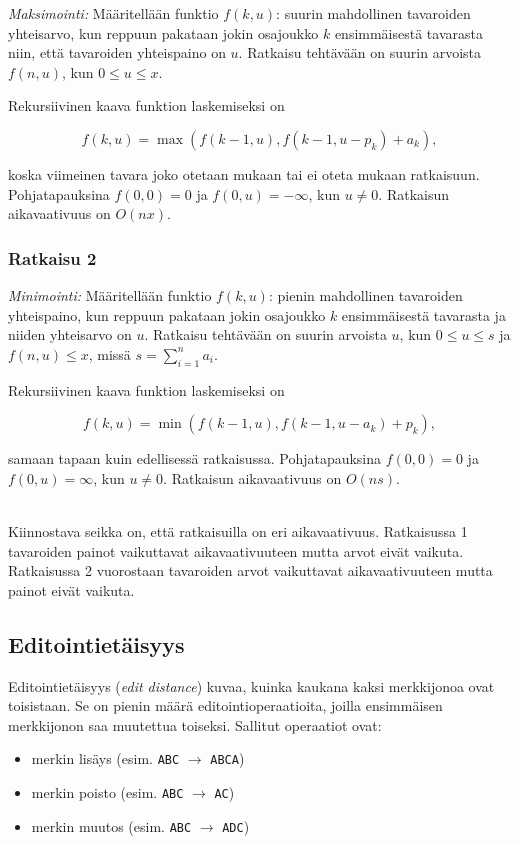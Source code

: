 \textit{Maksimointi:} Määritellään funktio $f(k,u)$:
suurin mahdollinen tavaroiden
yhteisarvo, kun reppuun pakataan jokin osajoukko
$k$ ensimmäisestä tavarasta
niin, että tavaroiden yhteispaino on $u$.
Ratkaisu tehtävään on suurin arvoista
$f(n,u)$, kun $0 \le u \le x$.

Rekursiivinen kaava funktion laskemiseksi on

\[f(k,u) = \max(f(k-1,u),f(k-1,u-p_k)+a_k),\]

koska viimeinen tavara joko otetaan mukaan tai ei
oteta mukaan ratkaisuun.
Pohjatapauksina $f(0,0)=0$ ja $f(0,u)=-\infty$,
kun $u \neq 0$. Ratkaisun aikavaativuus on $O(nx)$.

\subsubsection{Ratkaisu 2}

\textit{Minimointi:} Määritellään funktio $f(k,u)$:
pienin mahdollinen tavaroiden yhteispaino,
kun reppuun pakataan jokin osajoukko
$k$ ensimmäisestä tavarasta ja niiden yhteisarvo on $u$.
Ratkaisu tehtävään on suurin arvoista
$u$, kun $0 \le u \le s$ ja $f(n,u) \le x$,
missä $s=\sum_{i=1}^n a_i$.

Rekursiivinen kaava funktion laskemiseksi on

\[f(k,u) = \min(f(k-1,u),f(k-1,u-a_k)+p_k),\]

samaan tapaan kuin edellisessä ratkaisussa.
Pohjatapauksina $f(0,0)=0$ ja $f(0,u)=\infty$, kun $u \neq 0$.
Ratkaisun aikavaativuus on $O(ns)$.


~\\
\noindent
Kiinnostava seikka on, että ratkaisuilla on eri aikavaativuus.
Ratkaisussa 1 tavaroiden painot vaikuttavat aikavaativuuteen
mutta arvot eivät vaikuta.
Ratkaisussa 2 vuorostaan tavaroiden arvot vaikuttavat aikavaativuuteen
mutta painot eivät vaikuta.

\subsection{Editointietäisyys}


Editointietäisyys (\textit{edit distance})
kuvaa, kuinka kaukana kaksi merkkijonoa ovat toisistaan.
Se on pienin määrä editointioperaatioita,
joilla ensimmäisen merkkijonon saa muutettua toiseksi.
Sallitut operaatiot ovat:
\begin{itemize}
\item merkin lisäys (esim. \texttt{ABC} $\rightarrow$ \texttt{ABCA})
\item merkin poisto (esim. \texttt{ABC} $\rightarrow$ \texttt{AC})
\item merkin muutos (esim. \texttt{ABC} $\rightarrow$ \texttt{ADC})
\end{itemize}


